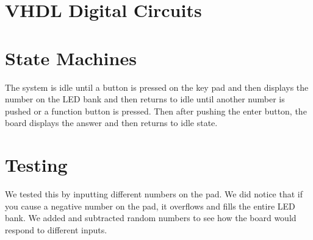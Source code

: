  \section{VHDL Digital Circuits}
    
 \section{State Machines}
    The system is idle until a button is pressed on the key pad and then displays the number on the LED bank and then returns to idle until another number is pushed or a function button is pressed. Then after pushing the enter button, the board displays the answer and then returns to idle state. 
 \section{Testing}
    We tested this by inputting different numbers on the pad. We did notice that if you cause a negative number on the pad, it overflows and fills the entire LED bank. We added and subtracted random numbers to see how the board would respond to different inputs. 
